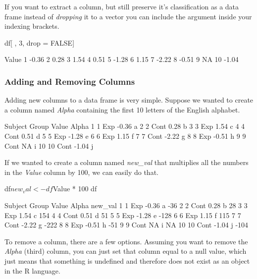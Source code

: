 If you want to extract a column, but still preserve it's classification as a data frame instead of \textit{dropping} it to a vector you can include the argument  inside your indexing brackets.

\begin{inR}
df[ , 3, drop = FALSE]
\end{inR}
\begin{outR}
   Value
1  -0.36
2   0.28
3   1.54
4   0.51
5  -1.28
6   1.15
7  -2.22
8  -0.51
9     NA
10 -1.04
\end{outR}

\subsubsection{Adding and Removing Columns}

Adding new columns to a data frame is very simple. Suppose we wanted to create a column named \textit{Alpha} containing the first 10 letters of the English alphabet.

\begin{outR}
   Subject Group Value Alpha
1        1   Exp -0.36     a
2        2  Cont  0.28     b
3        3   Exp  1.54     c
4        4  Cont  0.51     d
5        5   Exp -1.28     e
6        6   Exp  1.15     f
7        7  Cont -2.22     g
8        8   Exp -0.51     h
9        9  Cont    NA     i
10      10  Cont -1.04     j
\end{outR}

If we wanted to create a column named \textit{new\_val} that multiplies all the numbers in the \textit{Value} column by 100, we can easily do that.

\begin{inR}
df$new_val <- df$Value * 100
df
\end{inR}
\begin{outR}
   Subject Group Value Alpha new_val
1        1   Exp -0.36     a     -36
2        2  Cont  0.28     b      28
3        3   Exp  1.54     c     154
4        4  Cont  0.51     d      51
5        5   Exp -1.28     e    -128
6        6   Exp  1.15     f     115
7        7  Cont -2.22     g    -222
8        8   Exp -0.51     h     -51
9        9  Cont    NA     i      NA
10      10  Cont -1.04     j    -104
\end{outR}

To remove a column, there are a few options. Assuming you want to remove the \textit{Alpha} (third) column, you can just set that column equal to a \gls{null value}, which just means that something is undefined and therefore does not exist as an object in the R language.

